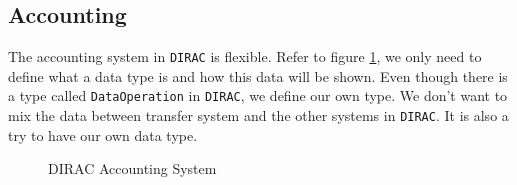 \subsection{Accounting}

The accounting system 
in {\tt DIRAC} is flexible. Refer to figure \ref{fig:acct},
we only need to define 
what a data type is and how this data will be shown.
Even though there is a type called {\tt DataOperation} in {\tt DIRAC},
we define our own type. We don't want to mix the data between 
transfer system and the other systems in {\tt DIRAC}.
It is also a try to have our own data type.
\begin{figure}[htbp]
    
    \caption{\label{fig:acct}DIRAC Accounting System}
\end{figure}
